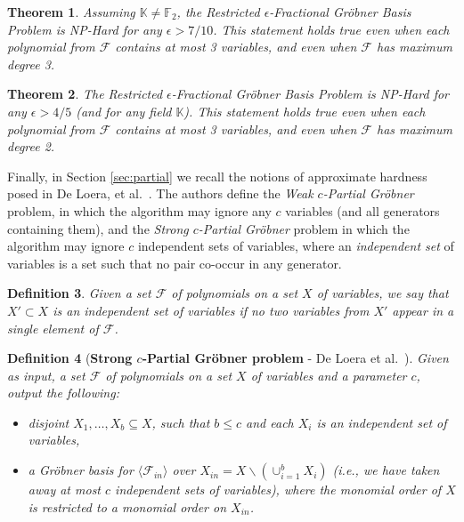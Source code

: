 \documentclass{article}
\newcommand{\F}[0]{\mathcal{F}}
\newcommand{\K}[0]{\mathbb{K}}
\newcommand{\bs}[0]{\backslash}
\newcommand{\ep}[0]{\epsilon}
\newtheorem{thm}{Theorem}
\newtheorem{defn}[thm]{Definition}
\begin{document}
\begin{thm}
\label{extfrachard}
Assuming $\K\ne \mathbb{F}_2$, the Restricted $\ep$\nobreakdash-Fractional Gr\"{o}bner Basis Problem is NP-Hard for any $\ep>7/10$. This statement holds true even when each polynomial from $\mathcal{F}$ contains at most 3 variables, and even when $\mathcal{F}$ has maximum degree 3.
\end{thm}



\begin{thm}
\label{extfracharddeg2}
The Restricted $\ep$\nobreakdash-Fractional Gr\"{o}bner Basis Problem is NP-Hard for any $\ep>4/5$ (and for any field $\K$). This statement holds true even when each polynomial from $\mathcal{F}$ contains at most 3 variables, and even when $\mathcal{F}$ has maximum degree 2.
\end{thm}

Finally, in Section \ref{sec:partial} we recall the notions of approximate hardness posed in De Loera, et al.~\cite{deloera}.  The authors define the \textit{Weak $c$\nobreakdash-Partial Gr\"obner} problem, in which the algorithm may ignore any $c$ variables (and all generators containing them), and the \textit{Strong $c$\nobreakdash-Partial Gr\"{o}bner} problem in which the algorithm may ignore $c$ independent sets of variables, where an \emph{independent set} of variables is a set such that no pair co-occur in any generator.

\begin{defn}
Given a set $\F$ of polynomials on a set $X$ of variables, we say that $X'\subset X$ is an \emph{independent set}  of variables if no two variables from $X'$ appear in a single element of $\F$.
\end{defn}

\begin{defn}[\textbf{Strong $c$\nobreakdash-Partial Gr\"{o}bner problem} - De Loera et al.~\cite{deloera}]
Given as input, a set $\F$ of polynomials on a set $X$ of variables and a parameter $c$, output the following:
\begin{itemize}
\item disjoint $X_1,\ldots,X_b\subseteq X$, such that $b\leq c$ and each $X_i$ is an independent set of variables,
\item a Gr\"{o}bner basis for $\langle \F_{in}\rangle$ over $X_{in}=X\bs (\cup_{i=1}^b X_i)$ (i.e., we have taken away at most $c$ independent sets of variables), where the monomial order of $X$ is restricted to a monomial order on $X_{in}$.
\end{itemize}
\end{defn}
\end{document}
